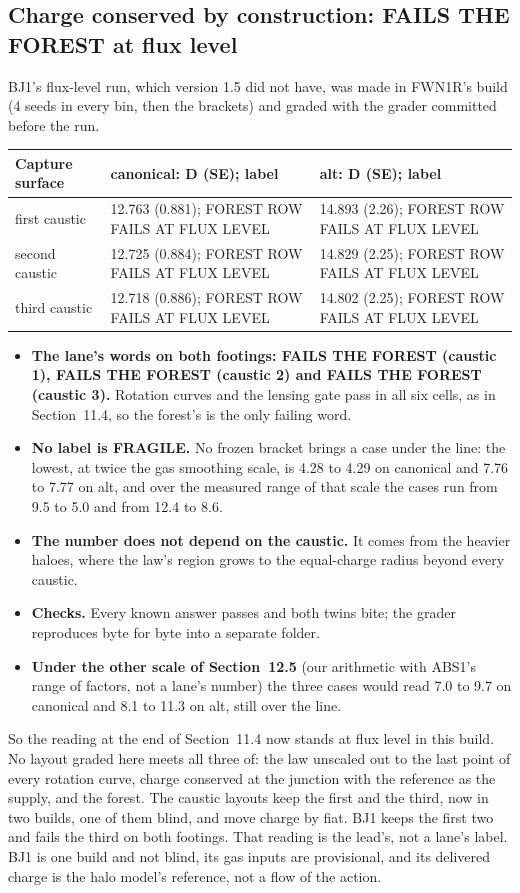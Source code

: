 \documentclass[10pt]{article}
\begin{document}
\subsection{Charge conserved by construction: FAILS THE FOREST at flux level}
BJ1's flux-level run, which version 1.5 did not have, was made in FWN1R's build (4 seeds in every bin, then the brackets) and graded with the grader committed before the run.
{\small
\begin{longtable}{@{}p{3.4cm}p{6.0cm}p{6.0cm}@{}}\toprule
Capture surface & canonical: D (SE); label & alt: D (SE); label\\\midrule\endhead
first caustic & 12.763 (0.881); FOREST ROW FAILS AT FLUX LEVEL & 14.893 (2.26); FOREST ROW FAILS AT FLUX LEVEL\\
second caustic & 12.725 (0.884); FOREST ROW FAILS AT FLUX LEVEL & 14.829 (2.25); FOREST ROW FAILS AT FLUX LEVEL\\
third caustic & 12.718 (0.886); FOREST ROW FAILS AT FLUX LEVEL & 14.802 (2.25); FOREST ROW FAILS AT FLUX LEVEL\\\bottomrule
\end{longtable}}
\begin{itemize}
\item \textbf{The lane's words on both footings: FAILS THE FOREST (caustic 1), FAILS THE FOREST (caustic 2) and FAILS THE FOREST (caustic 3).} Rotation curves and the lensing gate pass in all six cells, as in Section~11.4, so the forest's is the only failing word.
\item \textbf{No label is FRAGILE.} No frozen bracket brings a case under the line: the lowest, at twice the gas smoothing scale, is 4.28 to 4.29 on canonical and 7.76 to 7.77 on alt, and over the measured range of that scale the cases run from 9.5 to 5.0 and from 12.4 to 8.6.
\item \textbf{The number does not depend on the caustic.} It comes from the heavier haloes, where the law's region grows to the equal-charge radius beyond every caustic.
\item \textbf{Checks.} Every known answer passes and both twins bite; the grader reproduces byte for byte into a separate folder.
\item \textbf{Under the other scale of Section~12.5} (our arithmetic with ABS1's range of factors, not a lane's number) the three cases would read 7.0 to 9.7 on canonical and 8.1 to 11.3 on alt, still over the line.
\end{itemize}
So the reading at the end of Section~11.4 now stands at flux level in this build. No layout graded here meets all three of: the law unscaled out to the last point of every rotation curve, charge conserved at the junction with the reference as the supply, and the forest. The caustic layouts keep the first and the third, now in two builds, one of them blind, and move charge by fiat. BJ1 keeps the first two and fails the third on both footings. That reading is the lead's, not a lane's label. BJ1 is one build and not blind, its gas inputs are provisional, and its delivered charge is the halo model's reference, not a flow of the action.
\end{document}
